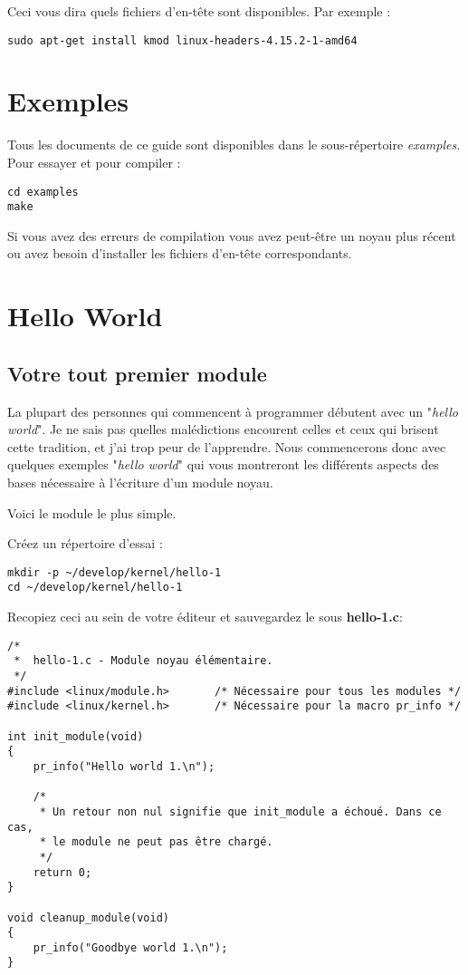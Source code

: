 \documentclass[11pt]{article}
\begin{document}
Ceci vous dira quels fichiers d'en-tête sont disponibles. Par exemple :

\begin{verbatim}
sudo apt-get install kmod linux-headers-4.15.2-1-amd64
\end{verbatim}

\section*{Exemples}
\label{sec-3}

Tous les documents de ce guide sont disponibles dans le sous-répertoire \emph{examples}. Pour essayer et pour compiler :

\begin{verbatim}
cd examples
make
\end{verbatim}

Si vous avez des erreurs de compilation vous avez peut-être un noyau plus récent ou avez besoin d'installer les fichiers d'en-tête correspondants.

\section*{Hello World}
\label{sec-4}
\subsection*{Votre tout premier module}
\label{sec-4-1}

La plupart des personnes qui commencent à programmer débutent avec un "\emph{hello world}". Je ne sais pas quelles malédictions encourent celles et ceux qui brisent cette tradition, et j'ai trop peur de l'apprendre. Nous commencerons donc avec quelques exemples "\emph{hello world}" qui vous montreront les différents aspects des bases nécessaire à l'écriture d'un module noyau.

Voici le module le plus simple.

Créez un répertoire d'essai :

\begin{verbatim}
mkdir -p ~/develop/kernel/hello-1
cd ~/develop/kernel/hello-1
\end{verbatim}

Recopiez ceci au sein de votre éditeur et sauvegardez le sous \textbf{hello-1.c}:

\begin{verbatim}
/*
 *  hello-1.c - Module noyau élémentaire.
 */
#include <linux/module.h>       /* Nécessaire pour tous les modules */
#include <linux/kernel.h>       /* Nécessaire pour la macro pr_info */

int init_module(void)
{
    pr_info("Hello world 1.\n");

    /*
     * Un retour non nul signifie que init_module a échoué. Dans ce cas,
     * le module ne peut pas être chargé.
     */
    return 0;
}

void cleanup_module(void)
{
    pr_info("Goodbye world 1.\n");
}
\end{verbatim}
\end{document}
